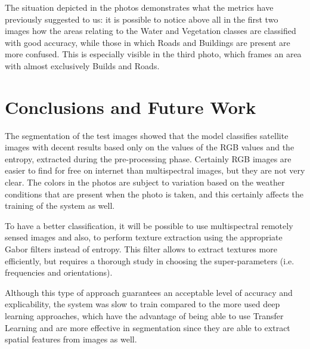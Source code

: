 \documentclass[10pt,twocolumn,letterpaper]{article}
\begin{document}
The situation depicted in the photos demonstrates what the metrics have previously suggested to us: it is possible to notice above all in the first two images how the areas relating to the Water and Vegetation classes are classified with good accuracy, while those in which Roads and Buildings are present are more confused. This is especially visible in the third photo, which frames an area with almost exclusively Builds and Roads.

\section{Conclusions and Future Work}

The segmentation of the test images showed that the model classifies satellite images with decent results based only on the values of the RGB values and the entropy, extracted during the pre-processing phase. Certainly RGB images are easier to find for free on internet than multispectral images, but they are not very clear. The colors in the photos are subject to variation based on the weather conditions that are present when the photo is taken, and this certainly affects the training of the system as well.

To have a better classification, it will be possible to use multispectral remotely sensed images and also, to perform texture extraction using the appropriate Gabor filters instead of entropy.
This filter allows to extract textures more efficiently, but requires a thorough study in choosing the super-parameters (i.e. frequencies and orientations).

Although this type of approach guarantees an acceptable level of accuracy and explicability, the system was slow to train compared to the more used deep learning approaches, which have the advantage of being able to use Transfer Learning and are more effective in segmentation since they are able to extract spatial features from images as well.


{\small


}
\end{document}
